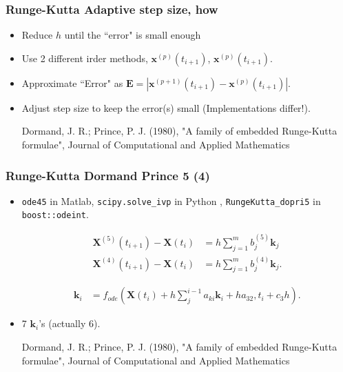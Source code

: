 \documentclass{beamer}
\begin{document}
\begin{frame}
\frametitle{Runge-Kutta Adaptive step size, how}
\begin{itemize}
\item <1-> Reduce $h$ until the ``error" is small enough

\item <2-> Use 2 different irder methods, $\mathbf{x}^{(p)}(t_{i+1})$, $\mathbf{x}^{(p)}(t_{i+1})$.

\item <3-> Approximate ``Error" as  $\mathbf{E} = |\mathbf{x}^{(p+1)}(t_{i+1})-\mathbf{x}^{(p)}(t_{i+1})|$.

\item <4-> Adjust step size to keep the error(s) small (Implementations differ!).

{\color{gray} Dormand, J. R.; Prince, P. J. (1980), "A family of embedded Runge-Kutta formulae", Journal of Computational and Applied Mathematics}
\begin{equation}
\end{equation}


\end{itemize}
\end{frame}


\begin{frame}
\frametitle{Runge-Kutta Dormand Prince 5 (4)}

\begin{itemize}
\item <1->\lstinline{ode45} in Matlab, \lstinline{scipy.solve_ivp} in Python , \lstinline{RungeKutta_dopri5} in \lstinline{boost::odeint}.

\begin{align*}
\mathbf{X}^{(5)}(t_{i+1})-\mathbf{X}(t_{i}) &=  h \sum_{j=1}^{m} b_j^{(5)} \mathbf{k}_j\\
\mathbf{X}^{(4)}(t_{i+1})-\mathbf{X}(t_{i}) &=  h \sum_{j=1}^{m} b_j^{(4)} \mathbf{k}_j.
\end{align*}

\begin{align*}
\mathbf{k}_i &= f_{ode}(\mathbf{X}(t_i)+h \sum_j^{i-1} a_{ki} \mathbf{k}_i+ha_{32},t_i+c_3 h).
\end{align*}

\item <2-> 7 $\mathbf{k}_i$'s (actually 6).

{\color{gray} Dormand, J. R.; Prince, P. J. (1980), "A family of embedded Runge-Kutta formulae", Journal of Computational and Applied Mathematics}
\end{itemize}
\end{frame}
\end{document}
